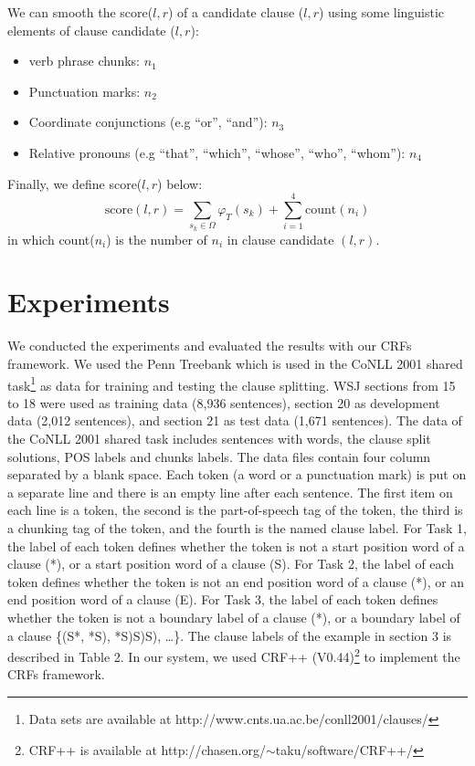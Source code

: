 \documentclass[english]{jnlp_1.4}
\begin{document}
{We can smooth the score($l,r$) of a candidate clause ($l,r$) using
some linguistic elements of clause candidate ($l,r$):
\begin{itemize}
\item verb phrase chunks: $n_1$ \item Punctuation marks: $n_2$
\item Coordinate conjunctions (e.g ``or'', ``and''): $n_3$ \item
Relative pronouns (e.g ``that'', ``which'', ``whose'', ``who'',
``whom''): $n_4$
\end{itemize}


Finally, we define score($l,r$) below:
\begin{equation}
\mathrm {score}(l,r) = \sum_{s_k \in \Omega}{\varphi}_{T}(s_k) +
\sum_{i = 1}^4 \mathrm{count}(n_i)
\end{equation}
in which count($n_i$) is the number of $n_i$ in clause
candidate $(l,r)$.


\section{Experiments}

We conducted the experiments and evaluated the results with our
CRFs framework. We used the Penn Treebank which is used in the
CoNLL 2001 shared task\footnote{Data sets are available at
http://www.cnts.ua.ac.be/conll2001/clauses/} \cite{Sang2001} as
data for training and testing the clause splitting. WSJ sections
from 15 to 18 were used as training data (8,936 sentences),
section 20 as development data (2,012 sentences), and section 21
as test data (1,671 sentences). The data of the CoNLL 2001 shared
task includes sentences with words, the clause split solutions,
POS labels and chunks labels. The data files contain four column
separated by a blank space. Each token (a word or a punctuation
mark) is put on a separate line and there is an empty line after
each sentence. The first item on each line is a token, the second
is the part-of-speech tag of the token, the third is a chunking
tag of the token, and the fourth is the named clause label. For
Task 1, the label of each token defines whether the token is not a
start position word of a clause (*), or a start position word of a
clause (S). For Task 2, the label of each token defines whether
the token is not an end position word of a clause (*), or an end
position word of a clause (E). For Task 3, the label of each token
defines whether the token is not a boundary label of a clause (*),
or a boundary label of a clause \{(S*, *S), *S)S)S), \dots\}. The
clause labels of the example in section 3 is described in Table 2.
In our system, we used CRF++ (V0.44)\footnote{CRF++ is available
at http://chasen.org/$\sim$taku/software/CRF++/} to implement the
CRFs framework.

}
\end{document}
